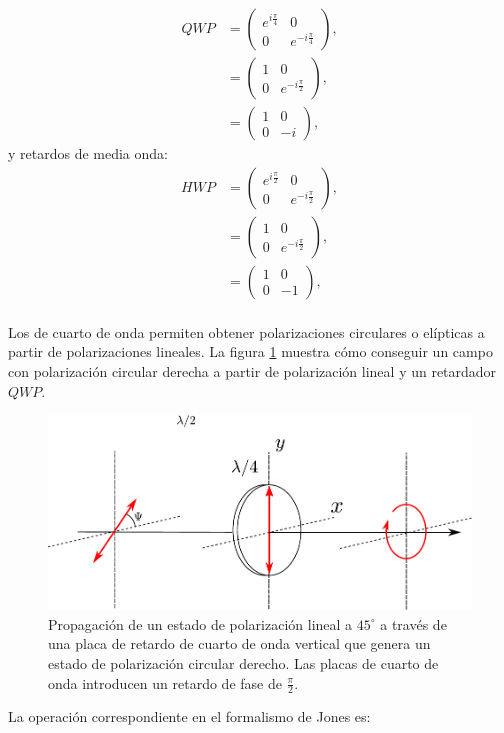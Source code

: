 \begin{align*}
QWP &= \begin{pmatrix} e^{i\frac{\pi}{4}}  &0\\0&e^{-i\frac{\pi}{4}}\end{pmatrix},\\
&=  \begin{pmatrix} 1 &0\\0&e^{-i\frac{\pi}{2}}\end{pmatrix},\\
&=  \begin{pmatrix} 1 &0\\0&-i\end{pmatrix},
\end{align*}
y retardos de
media onda:
\begin{align*}
HWP &= \begin{pmatrix} e^{i\frac{\pi}{2}}  &0\\0&e^{-i\frac{\pi}{2}}\end{pmatrix},\\
&=  \begin{pmatrix} 1 &0\\0&e^{-i\frac{\pi}{2}}\end{pmatrix},\\
&=  \begin{pmatrix} 1 &0\\0&-1\end{pmatrix},\\
\end{align*}


Los de cuarto de onda permiten obtener polarizaciones
circulares o elípticas a partir de polarizaciones lineales. La figura
\ref{fig:qwp_retarder} muestra cómo conseguir un campo con
polarización circular derecha a partir de polarización lineal y un 
retardador $QWP$.
\begin{figure}[h!]
\centering
\includegraphics[scale=.7]{qwp_retarder}
\caption{Propagación de un estado de polarización lineal a
  $45^{\circ}$ a través de una placa de retardo de cuarto de onda
  vertical que genera un estado de polarización circular derecho. Las
placas de cuarto de onda introducen un retardo de fase de
$\frac{\pi}{2}$.}
\label{fig:qwp_retarder}
\end{figure}
La operación correspondiente en el formalismo de Jones es:

